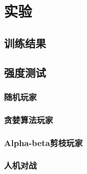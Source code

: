 \chapter{实验}
\label{chap:experiment}

\section{训练结果}

\section{强度测试}

\subsection{随机玩家}

\subsection{贪婪算法玩家}

\subsection{Alpha-beta剪枝玩家}

\subsection{人机对战}

